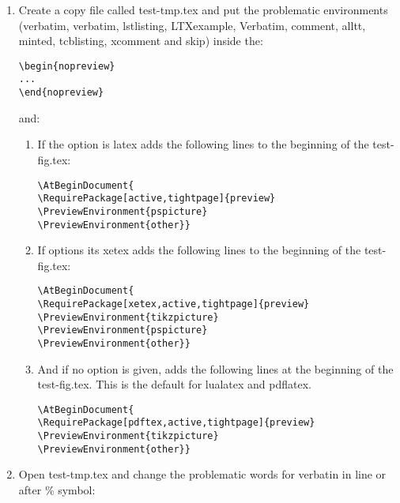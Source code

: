 \documentclass[11pt]{article}
\begin{document}
\begin{enumerate}
\item  Create a copy file called test-tmp.tex and put the problematic environments (verbatim, verbatim\*, lstlisting,
 LTXexample, Verbatim, comment, alltt, minted, tcblisting, xcomment and skip) inside the:

\begin{lstlisting}
\begin{nopreview}
...
\end{nopreview}
\end{lstlisting}

and: 
\begin{enumerate}
\item If the option is latex adds the following lines to the beginning of the test-fig.tex:

\begin{lstlisting}
\AtBeginDocument{
\RequirePackage[active,tightpage]{preview}
\PreviewEnvironment{pspicture}
\PreviewEnvironment{other}}
\end{lstlisting}

\item If options its xetex adds the following lines to the beginning of the test-fig.tex:

\begin{lstlisting}
\AtBeginDocument{
\RequirePackage[xetex,active,tightpage]{preview}
\PreviewEnvironment{tikzpicture}
\PreviewEnvironment{pspicture}
\PreviewEnvironment{other}}
\end{lstlisting}

\item And if no option is given, adds the following lines at the beginning of the test-fig.tex. This is the default for
lualatex and pdflatex.

\begin{lstlisting}
\AtBeginDocument{
\RequirePackage[pdftex,active,tightpage]{preview}
\PreviewEnvironment{tikzpicture}
\PreviewEnvironment{other}}
\end{lstlisting}

\end{enumerate}

\item Open test-tmp.tex and change the problematic words for verbatin in line or after \% symbol:


\end{enumerate}
\end{document}

